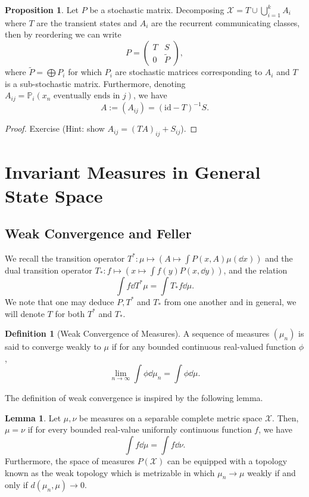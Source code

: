 \documentclass[]{article}
\theoremstyle{definition}
\theoremstyle{definition}
\newtheorem{definition}{Definition}[section]
\newtheorem{lemma}{Lemma}[section]
\newtheorem{proposition}{Proposition}[section]
\begin{document}
\begin{proposition}
  Let \(P\) be a stochastic matrix. Decomposing 
  \(\mathcal{X} = T \cup \bigcup_{i = 1}^k A_i\) where \(T\) are the transient 
  states and \(A_i\) are the recurrent communicating classes, then by reordering 
  we can write
  \[P = \begin{pmatrix}
    T & S\\ 
    0 & \tilde P
  \end{pmatrix},\]
  where \(\tilde P = \bigoplus P_i\) for which \(P_i\) are stochastic matrices 
  corresponding to \(A_i\) and \(T\) is a sub-stochastic matrix. Furthermore,
  denoting \(A_{ij} = \mathbb{P}_i(x_n \text{ eventually ends in } j)\), we 
  have 
  \[A := (A_{ij}) = (\text{id} - T)^{-1}S.\]
\end{proposition}
\begin{proof}
  Exercise (Hint: show \(A_{ij} = (TA)_{ij} + S_{ij}\)).
\end{proof}

\newpage
\section{Invariant Measures in General State Space}

\subsection{Weak Convergence and Feller}

We recall the transition operator \(T^* : \mu \mapsto (A \mapsto \int P(x, A) \mu(\dd x))\) 
and the dual transition operator \(T_* : f \mapsto (x \mapsto \int f(y) P(x, \dd y))\),
and the relation 
\[\int f \dd T^* \mu = \int T_* f \dd \mu.\]
We note that one may deduce \(P, T^*\) and \(T_*\) from one another and 
in general, we will denote \(T\) for both \(T^*\) and \(T_*\).

\begin{definition}[Weak Convergence of Measures]
  A sequence of measures \((\mu_n)\) is said to converge weakly to \(\mu\) 
  if for any bounded continuous real-valued function \(\phi\), 
  \[\lim_{n \to \infty} \int \phi \dd \mu_n = \int \phi \dd \mu.\]
\end{definition}

The definition of weak convergence is inspired by the following lemma.

\begin{lemma}
  Let \(\mu, \nu\) be measures on a separable complete metric space \(\mathcal{X}\). 
  Then, \(\mu = \nu\) if for every bounded real-value uniformly continuous function
  \(f\), we have 
  \[\int f \dd \mu = \int f \dd \nu.\]
  Furthermore, the space of measures \(P(\mathcal{X})\) can be equipped with 
  a topology known as the weak topology which is metrizable in which 
  \(\mu_n \to \mu\) weakly if and only if \(d(\mu_n, \mu) \to 0\).
\end{lemma}
\end{document}
